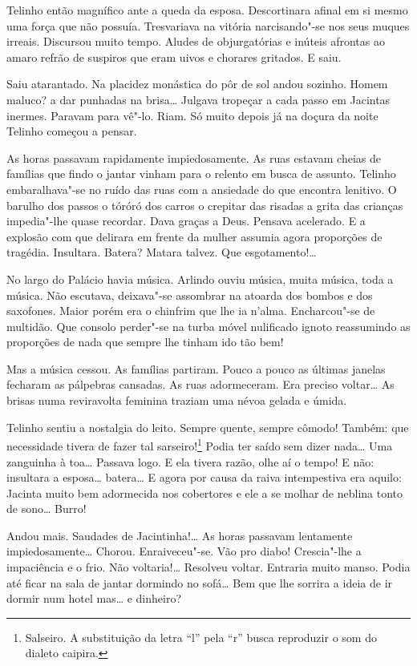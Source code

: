 \begin{linenumbers}
Telinho então magnífico ante a queda da esposa. Descortinara afinal em
si mesmo uma força que não possuía. Tresvariava na vitória narcisando"-se
nos seus muques irreais. Discursou muito tempo. Aludes de objurgatórias
e inúteis afrontas ao amaro refrão de suspiros que eram uivos e chorares
gritados. E saiu.

Saiu atarantado. Na placidez monástica do pôr de sol andou sozinho.
Homem maluco? a dar punhadas na brisa\ldots{} Julgava tropeçar a cada passo
em Jacintas inermes. Paravam para vê"-lo. Riam. Só muito depois já na
doçura da noite Telinho começou a pensar.

As horas passavam rapidamente impiedosamente. As ruas estavam cheias de
famílias que findo o jantar vinham para o relento em busca de assunto.
Telinho embaralhava"-se no ruído das ruas com a ansiedade do que encontra
lenitivo. O barulho dos passos o tóróró dos carros o crepitar das
risadas a grita das crianças impedia"-lhe quase recordar. Dava graças a
Deus. Pensava acelerado. E a explosão com que delirara em frente da
mulher assumia agora proporções de tragédia. Insultara. Batera? Matara
talvez. Que esgotamento!\ldots{}

No largo do Palácio havia música. Arlindo ouviu música, muita música,
toda a música. Não escutava, deixava"-se assombrar na atoarda dos bombos
e dos saxofones. Maior porém era o chinfrim que lhe ia n'alma.
Encharcou"-se de multidão. Que consolo perder"-se na turba móvel
nulificado ignoto reassumindo as proporções de nada que sempre lhe
tinham ido tão bem!

Mas a música cessou. As famílias partiram. Pouco a pouco as últimas
janelas fecharam as pálpebras cansadas. As ruas adormeceram. Era preciso
voltar\ldots{} As brisas numa reviravolta feminina traziam uma névoa gelada e
úmida.

Telinho sentiu a nostalgia do leito. Sempre quente, sempre cômodo!
Também: que necessidade tivera de fazer tal sarseiro!\footnote{Salseiro.
  A substituição da letra ``l'' pela ``r'' busca reproduzir o som do
  dialeto caipira.} Podia ter saído sem dizer nada\ldots{} Uma zanguinha à
toa\ldots{} Passava logo. E ela tivera razão, olhe aí o tempo! E não:
insultara a esposa\ldots{} batera\ldots{} E agora por causa da raiva intempestiva
era aquilo: Jacinta muito bem adormecida nos cobertores e ele a se
molhar de neblina tonto de sono\ldots{} Burro!

Andou mais. Saudades de Jacintinha!\ldots{} As horas passavam lentamente
impiedosamente\ldots{} Chorou. Enraiveceu"-se. Vão pro diabo! Crescia"-lhe a
impaciência e o frio. Não voltaria!\ldots{} Resolveu voltar. Entraria muito
manso. Podia até ficar na sala de jantar dormindo no sofá\ldots{} Bem que lhe
sorrira a ideia de ir dormir num hotel mas\ldots{} e dinheiro?


\end{linenumbers}
